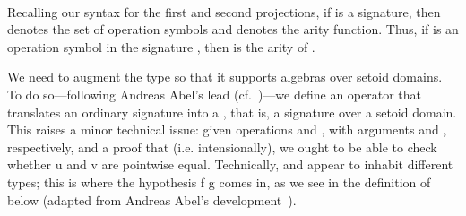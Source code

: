 \begin{center}

\AgdaSpace{}%
\AgdaSymbol{:}\AgdaSpace{}%
\AgdaSymbol{(}\AgdaSpace{}%
\AgdaSpace{}%
\AgdaSymbol{:}\AgdaSpace{}%
\AgdaSymbol{)}\AgdaSpace{}%
\AgdaSpace{}%
\AgdaSpace{}%
\AgdaSymbol{(}\AgdaSpace{}%
\AgdaSymbol{(}\AgdaSpace{}%
\AgdaSpace{}%
\AgdaSymbol{))}\\[4pt]
\AgdaSpace{}%
\AgdaSpace{}%
\AgdaSpace{}%
\AgdaSymbol{=}\AgdaSpace{}%
\AgdaFunction{Σ[}\AgdaSpace{}%
\AgdaSpace{}%
\AgdaSpace{}%
\AgdaSpace{}%
\AgdaSpace{}%
\AgdaFunction{]}\AgdaSpace{}%
\AgdaSymbol{(}\AgdaSpace{}%
\AgdaSpace{}%
\AgdaSpace{}%
\AgdaSymbol{)}

\end{center}
Recalling our syntax for the first and second
projections, if  %
is a signature, then
   denotes the set of operation symbols and    denotes the arity function.
Thus, if  \as{:}    is an operation symbol in the
signature , then     is the arity of .

We need to augment the  type so that it supports algebras over setoid domains.
\ifshort\else
To do so---following Andreas Abel's lead (cf.~\cite{Abel:2021})---we
define an operator that translates an ordinary signature into a ,
that is, a signature over a setoid domain.
\fi
This raises a minor technical issue:
given operations  and , with arguments
 \as{:}      and  \as{:}  
   , respectively, and a proof that    (i.e.
intensionally), we ought to be able to check whether \ab u and \ab v are pointwise
equal. Technically,  and  appear to inhabit different types; this is where the
hypothesis \ab f  \ab g comes in, as we see in the definition of  below (adapted
from Andreas Abel's development~\cite{Abel:2021}).

